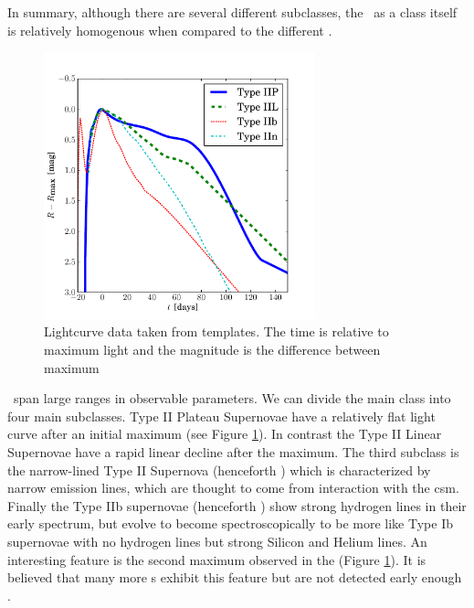 In summary, although there are several different subclasses, the \snia\ as a class itself is relatively homogenous when compared to the different \sneii.

\begin{figure}[htbp] %
   \centering
   \includegraphics[width=0.7\textwidth]{chapter_intro/plots/plot_li11_lc_type2.pdf} 
   \caption{Lightcurve data taken from \citet{2011MNRAS.412.1441L} templates. The time is relative to maximum light and the magnitude is the difference between maximum  }
   \label{fig:snii_lc}
\end{figure}

\sneii\ span large ranges in observable parameters. We can divide the main class into four main subclasses. Type II Plateau Supernovae \citep[henceforth \sniip;][]{1979A&A....72..287B} have a relatively flat light curve after an initial maximum (see Figure \ref{fig:snii_lc}). In contrast the Type II Linear Supernovae \citep[henceforth \sniil;][]{1990MNRAS.244..269S} have a rapid linear decline after the maximum. The third subclass is the narrow-lined Type II Supernova (henceforth \sniin) which is characterized by narrow emission lines, which are thought to come from interaction with the \gls{csm}. 
Finally the Type IIb supernovae (henceforth \sniib) show strong hydrogen lines in their early spectrum, but evolve to become spectroscopically to be more like Type Ib supernovae with no hydrogen lines but strong Silicon and Helium lines. An interesting feature is the second maximum observed in the \sniib {} (Figure \ref{fig:snii_lc}). It is believed that many more \sniib s exhibit this feature but are not detected early enough \citep[this feature has also been seen in SN2008D a  \snib][]{2008Natur.453..469S, 2009ApJ...702..226M}. 

